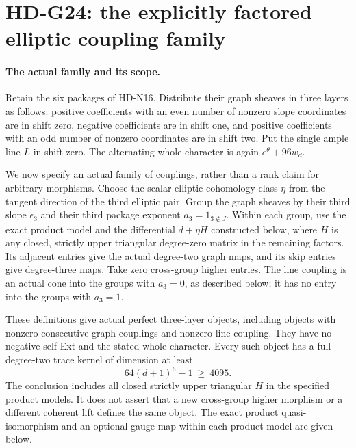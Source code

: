 \section{HD-G24: the explicitly factored elliptic coupling family}
\label{sec:factored-eta-family}

\paragraph{The actual family and its scope.}
Retain the six packages of HD-N16. Distribute their graph sheaves in
three layers as follows: positive coefficients with an even number
of nonzero slope coordinates are in shift zero, negative coefficients
are in shift one, and positive coefficients with an odd number of
nonzero coordinates are in shift two. Put the single ample line
\(L\) in shift zero. The alternating whole character is again
\(e^\theta+96w_d\).

We now specify an actual family of couplings, rather than a rank
claim for arbitrary morphisms. Choose the scalar elliptic
cohomology class \(\eta\) from the tangent direction of the third
elliptic pair. Group the graph sheaves by their third slope
\(\epsilon_3\) and their third package exponent
\(a_3=1_{3\notin J}\). Within each group, use the exact product
model and the differential \(d+\eta H\) constructed below, where
\(H\) is any closed, strictly upper triangular degree-zero matrix
in the remaining factors. Its adjacent entries give the actual
degree-two graph maps, and its skip entries give degree-three maps.
Take zero cross-group higher entries. The line coupling is an
actual cone into the groups with \(a_3=0\), as described below;
it has no entry into the groups with \(a_3=1\).

These definitions give actual perfect three-layer objects, including
objects with nonzero consecutive graph couplings and nonzero line
coupling. They have no negative self-Ext and the stated whole
character. Every such object has a full degree-two trace kernel of
dimension at least
\begin{equation}\label{eq:G24-lower}
                   64(d+1)^6-1\ \ge\ 4095.
\end{equation}
The conclusion includes all closed strictly upper triangular \(H\)
in the specified product models. It does not assert that a new
cross-group higher morphism or a different coherent lift defines
the same object. The exact product quasi-isomorphism and an optional
gauge map within each product model are given below.

